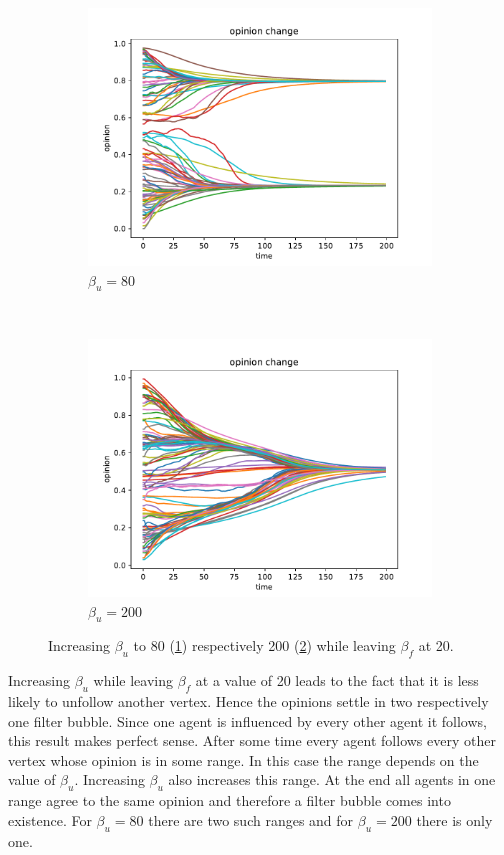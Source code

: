 \documentclass[11pt]{article}
\begin{document}
\begin{figure}[H]
    \begin{subfigure}[t]{0.5\textwidth}
    \includegraphics[width = \linewidth]{img/bu_high_1.pdf}
    \caption{$\beta_u=80$}\label{sfig:buhigh1}
    \end{subfigure}
    ~
    \begin{subfigure}[t]{0.5\textwidth}
    \includegraphics[width = \linewidth]{img/bu_high_2.pdf}
    \caption{$\beta_u=200$}\label{sfig:buhigh2}
    \end{subfigure}
    \caption{Increasing $\beta_u$ to 80 (\ref{sfig:buhigh1}) respectively 200 (\ref{sfig:buhigh2}) while leaving $\beta_f$ at 20.}\label{sfig:buhigh}
\end{figure}
Increasing $\beta_u$ while leaving $\beta_f$ at a value of 20 leads to the fact that it is less likely to unfollow another vertex. Hence the opinions settle in two respectively one filter bubble. Since one agent is influenced by every other agent it follows, this result makes perfect sense. After some time every agent follows every other vertex whose opinion is in some range. In this case the range depends on the value of $\beta_u$. Increasing $\beta_u$ also increases this range. At the end all agents in one range agree to the same opinion and therefore a filter bubble comes into existence. For $\beta_u=80$ there are two such ranges and for $\beta_u=200$ there is only one.
\end{document}
